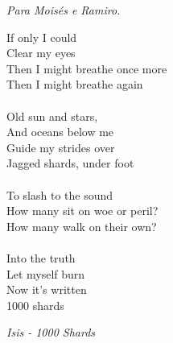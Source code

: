 \documentclass[12pt,twoside]{report}
\begin{document}
\newpage

\vspace*{0.75\textheight}
\begin{flushright}
  \emph{Para Moisés e Ramiro.}
\end{flushright}

\newpage

\vspace*{0.2\textheight}
{\noindent 
If only I could \\
Clear my eyes \\
Then I might breathe once more \\
Then I might breathe again \\
\vspace{0.2 cm} \\
Old sun and stars, \\
And oceans below me \\
Guide my strides over \\
Jagged shards, under foot \\
\vspace{0.2 cm} \\
To slash to the sound \\
How many sit on woe or peril? \\
How many walk on their own? \\
\vspace{0.2 cm} \\
Into the truth \\
Let myself burn \\
Now it's written \\
1000 shards \\
}
\begin{flushright}
\emph {Isis - 1000 Shards}
\end{flushright}

\newpage




%   
\end{document}
